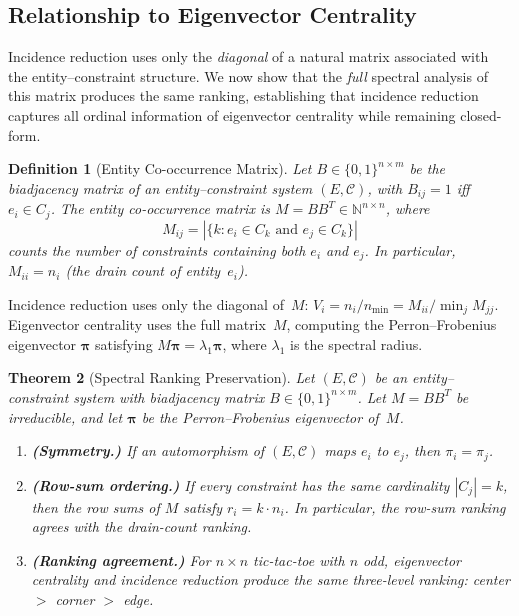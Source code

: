 \documentclass[11pt,a4paper]{article}
\newtheorem{theorem}{Theorem}
\newtheorem{definition}[theorem]{Definition}
\newcommand{\N}{\mathbb{N}}
\begin{document}
\subsection{Relationship to Eigenvector Centrality}
\label{sec:spectral}

Incidence reduction uses only the \emph{diagonal} of a natural matrix associated with the entity--constraint structure.
We now show that the \emph{full} spectral analysis of this matrix produces the same ranking, establishing that incidence reduction captures all ordinal information of eigenvector centrality while remaining closed-form.

\begin{definition}[Entity Co-occurrence Matrix]\label{def:cooccurrence}
Let $B \in \{0,1\}^{n \times m}$ be the \emph{biadjacency matrix} of an entity--constraint system $(E, \mathcal{C})$, with $B_{ij} = 1$ iff $e_i \in C_j$.
The \emph{entity co-occurrence matrix} is $M = BB^T \in \N^{n \times n}$, where
\[
  M_{ij} = |\{k : e_i \in C_k \text{ and } e_j \in C_k\}|
\]
counts the number of constraints containing both $e_i$ and $e_j$.
In particular, $M_{ii} = n_i$ (the drain count of entity~$e_i$).
\end{definition}

Incidence reduction uses only the diagonal of~$M$: $V_i = n_i / n_{\min} = M_{ii} / \min_j M_{jj}$.
Eigenvector centrality uses the full matrix~$M$, computing the Perron--Frobenius eigenvector $\boldsymbol{\pi}$ satisfying $M\boldsymbol{\pi} = \lambda_1 \boldsymbol{\pi}$, where $\lambda_1$ is the spectral radius.

\begin{theorem}[Spectral Ranking Preservation]\label{thm:spectral}
Let $(E, \mathcal{C})$ be an entity--constraint system with biadjacency matrix $B \in \{0,1\}^{n \times m}$.
Let $M = BB^T$ be irreducible, and let $\boldsymbol{\pi}$ be the Perron--Frobenius eigenvector of~$M$.
\begin{enumerate}
  \item[\emph{(i)}] \textbf{(Symmetry.)} If an automorphism of $(E, \mathcal{C})$ maps $e_i$ to $e_j$, then $\pi_i = \pi_j$.
  \item[\emph{(ii)}] \textbf{(Row-sum ordering.)} If every constraint has the same cardinality $|C_j| = k$, then the row sums of $M$ satisfy $r_i = k \cdot n_i$.  In particular, the row-sum ranking agrees with the drain-count ranking.
  \item[\emph{(iii)}] \textbf{(Ranking agreement.)} For $n \times n$ tic-tac-toe with $n$ odd, eigenvector centrality and incidence reduction produce the same three-level ranking: center $>$ corner $>$ edge.
\end{enumerate}
\end{theorem}
\end{document}
